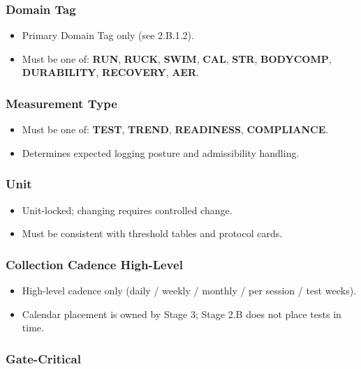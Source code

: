 \documentclass[10pt]{article}
\begin{document}
\subsubsection*{Domain Tag}

\begin{itemize}
\item Primary Domain Tag only (see 2.B.1.2).
\item Must be one of: \textbf{RUN}, \textbf{RUCK}, \textbf{SWIM}, \textbf{CAL}, \textbf{STR}, \textbf{BODYCOMP}, \textbf{DURABILITY}, \textbf{RECOVERY}, \textbf{AER}.
\end{itemize}

\subsubsection*{Measurement Type}

\begin{itemize}
\item Must be one of: \textbf{TEST}, \textbf{TREND}, \textbf{READINESS}, \textbf{COMPLIANCE}.
\item Determines expected logging posture and admissibility handling.
\end{itemize}

\subsubsection*{Unit}

\begin{itemize}
\item Unit-locked; changing requires controlled change.
\item Must be consistent with threshold tables and protocol cards.
\end{itemize}

\subsubsection*{Collection Cadence High-Level}

\begin{itemize}
\item High-level cadence only (daily / weekly / monthly / per session / test weeks).
\item Calendar placement is owned by Stage 3; Stage 2.B does not place tests in time.
\end{itemize}

\subsubsection*{Gate-Critical}
\end{document}
